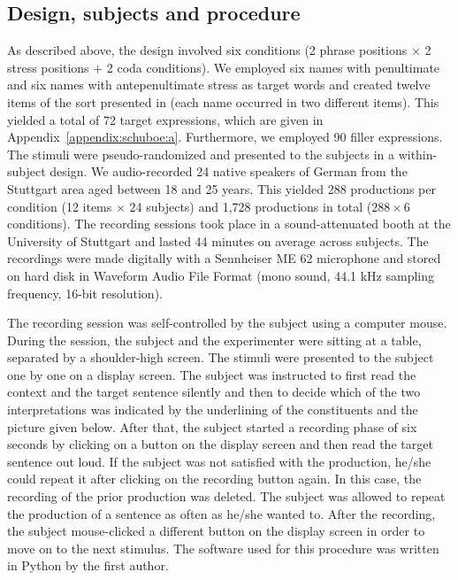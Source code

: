 \documentclass[output=paper]{langscibook}
\begin{document}
\subsection{Design, subjects and procedure}
As described above, the design involved six conditions (2 phrase positions $\times$ 2 stress positions + 2 coda conditions). We employed six names with penultimate and six names with antepenultimate stress as target words and created twelve items of the sort presented in  (each name occurred in two different items). This yielded a total of 72 target expressions, which are given in Appendix~\ref{appendix:schuboe:a}. Furthermore, we employed 90 filler expressions. The stimuli were pseudo-randomized and presented to the subjects in a within-subject design. We audio-recorded 24 native speakers of German from the Stuttgart area aged between 18 and 25 years. This yielded 288 productions per condition (12 items $\times$ 24 subjects) and 1,728 productions in total ($288 \times 6$ conditions). The recording sessions took place in a sound-attenuated booth at the University of Stuttgart and lasted 44 minutes on average across subjects. The recordings were made digitally with a Sennheiser ME 62 microphone and stored on hard disk in Waveform Audio File Format (mono sound, 44.1 kHz sampling frequency, 16-bit resolution).

The recording session was self-controlled by the subject using a computer mouse. During the session, the subject and the experimenter were sitting at a table, separated by a shoulder-high screen. The stimuli were presented to the subject one by one on a display screen. The subject was instructed to first read the context and the target sentence silently and then to decide which of the two interpretations was indicated by the underlining of the constituents and the picture given below. After that, the subject started a recording phase of six seconds by clicking on a button on the display screen and then read the target sentence out loud. If the subject was not satisfied with the production, he\slash she could repeat it after clicking on the recording button again. In this case, the recording of the prior production was deleted. The subject was allowed to repeat the production of a sentence as often as he\slash she wanted to. After the recording, the subject mouse-clicked a different button on the display screen in order to move on to the next stimulus. The software used for this procedure was written in Python by the first author.\largerpage
\end{document}
